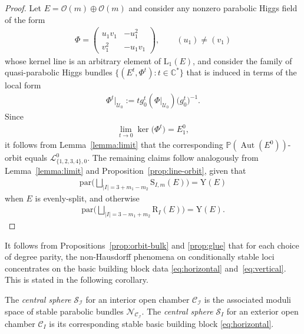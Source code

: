 \documentclass[pdftex]{sigma}
\newcommand{\field}[1]{\ensuremath{\mathbb{#1}}}
\newcommand{\CC}{\field{C}}
\newcommand{\PP}{\field{P}}
\newcommand{\calO}{\mathcal{O}}
\newcommand{\curly}[1]{\mathscr{#1}}
\newcommand{\cL}{\curly{L}}
\newcommand{\cN}{\curly{N}}
\newcommand{\cS}{\curly{S}}
\newcommand{\cU}{\curly{U}}
\newcommand{\qC}{\mathcal{C}}
\newcommand{\qI}{\mathcal{I}}
\DeclareMathOperator{\Aut}{Aut}
\numberwithin{equation}{section}
\begin{document}
\begin{proof}
Let $E = \calO(m)\oplus\calO(m)$ and consider any nonzero parabolic Higgs field of the form\vspace{-1ex}
\begin{gather*}
\Phi = \begin{pmatrix}
u_{1}v_{1} & - u_{1}^{2}\\
v_{1}^{2} & -u_{1}v_{1}
\end{pmatrix}\!,\qquad(u_{1})\neq (v_{1})
\end{gather*}
whose kernel line is an arbitrary element of $\mathrm{L}_{1}(E)$, and consider the family of quasi-parabolic Higgs bundles $\{(E^{t},\Phi^{t})\colon t\in\CC^{*}\}$ that is induced in terms of the local form\vspace{-1ex}
\begin{gather*}
\Phi^{t}\vert_{\cU_{0}} := t g^{t}_{0}(\Phi\vert_{\cU_{0}})\big(g^{t}_{0}\big)^{-1}.
\end{gather*}
Since\vspace{-1ex}
\begin{gather*}
\lim\limits_{t\to 0} \ker\big(\Phi^{t}\big) = E^{0}_{1},
\end{gather*}
it follows from Lemma~\ref{lemma:limit} that the corresponding $\PP(\Aut(E^{0}))$-orbit equals $\cL^{0}_{\{1,2,3,4\},0}$. The remaining claims follow analogously from Lemma~\ref{lemma:limit} and Proposition~\ref{prop:line-orbit}, given that\vspace{-1ex}
\begin{gather*}
\mathrm{par}\bigg( \bigsqcup_{\vert I \vert = 3 + m_{1} - m_{2}} \mathrm{S}_{I,m}(E)\bigg) = \mathrm{Y}(E)
\end{gather*}
when $E$ is evenly-split, and otherwise\vspace{-1ex}
\begin{gather*}
\mathrm{par}\bigg( \bigsqcup_{\vert I \vert = 3 - m_{1} + m_{2}} \mathrm{R}_{I}(E)\bigg) = \mathrm{Y}(E).
\tag*{\qed}
\end{gather*}
\renewcommand{\qed}{}
\end{proof}



It follows from Propositions~\ref{prop:orbit-bulk} and \ref{prop:glue} that for each choice of degree parity, the non-Hausdorff phenomena on conditionally stable loci concentrates on the basic building block data \eqref{eq:horizontal} and~\eqref{eq:vertical}. This is stated in the following corollary.

\begin{Definition}%
The \textit{central sphere} $\cS_{\qI}$ for an interior open chamber $\qC_{\qI}$ is the associated moduli space of stable parabolic bundles $\cN_{\qC_{\qI}}$. The \textit{central sphere} $\cS_{I}$ for an exterior open chamber $\qC_{I}$ is its corresponding stable basic building block \eqref{eq:horizontal}.
\end{Definition}
\end{document}
